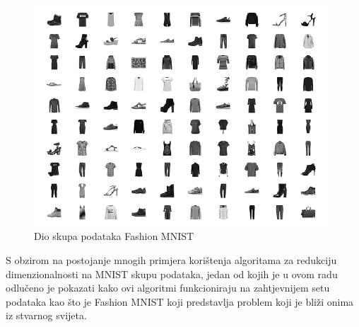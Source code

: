 \documentclass[times, utf8, diplomski]{fer}
\begin{document}
\begin{figure}[htb]
    \centering
    \includegraphics[width=11cm]{resources/images/reduction/compare/fmnist.png}
    \caption{Dio skupa podataka Fashion MNIST}
    \label{fig:fmnist}
\end{figure}

S obzirom na postojanje mnogih primjera korištenja algoritama za redukciju dimenzionalnosti na MNIST skupu podataka, jedan od kojih je \cite{scikit-learn} u ovom radu odlučeno je pokazati kako ovi algoritmi funkcioniraju na zahtjevnijem setu podataka kao što je Fashion MNIST koji predstavlja problem koji je bliži onima iz stvarnog svijeta.
\end{document}
